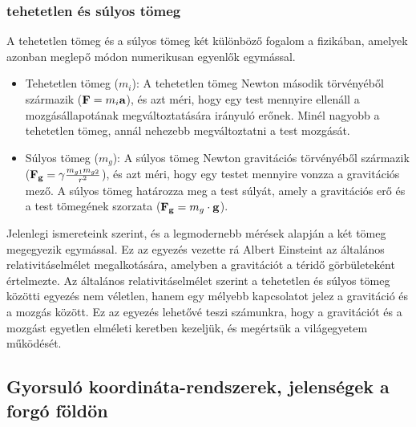 \documentclass[a4paper,12pt]{article}
\begin{document}
\subsubsection{tehetetlen és súlyos tömeg}
A tehetetlen tömeg és a súlyos tömeg két különböző fogalom a fizikában, amelyek azonban meglepő módon numerikusan egyenlők egymással.
\begin{itemize}
    \item Tehetetlen tömeg ($m_i$): A tehetetlen tömeg Newton második törvényéből származik ($\bold{F} = m_i\bold{a}$), és azt méri, hogy egy test mennyire ellenáll a mozgásállapotának megváltoztatására irányuló erőnek. Minél nagyobb a tehetetlen tömeg, annál nehezebb megváltoztatni a test mozgását.
    \item Súlyos tömeg ($m_g$): A súlyos tömeg Newton gravitációs törvényéből származik ($\bold{F_g} = \gamma \frac{m_{g1}m_{g2}}{r^2}$), és azt méri, hogy egy testet mennyire vonzza a gravitációs mező. A súlyos tömeg határozza meg a test súlyát, amely a gravitációs erő és a test tömegének szorzata ($\bold{F_g} = m_g\cdot \bold{g}$).
\end{itemize}
Jelenlegi ismereteink szerint, és a legmodernebb mérések alapján a két tömeg megegyezik egymással. Ez az egyezés vezette rá Albert Einsteint az általános relativitáselmélet megalkotására,
amelyben a gravitációt a téridő görbületeként értelmezte. Az általános relativitáselmélet szerint a tehetetlen és súlyos tömeg közötti egyezés nem véletlen, hanem egy mélyebb kapcsolatot jelez a gravitáció és a mozgás között.
Ez az egyezés lehetővé teszi számunkra, hogy a gravitációt és a mozgást egyetlen elméleti keretben kezeljük, és megértsük a világegyetem működését.

\subsection{Gyorsuló koordináta-rendszerek, jelenségek a forgó földön}
\end{document}
